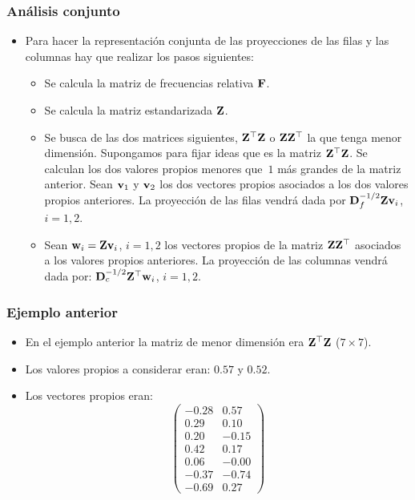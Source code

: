 \begin{frame}
\frametitle{Análisis conjunto}
\begin{itemize}
\item<2->{Para hacer la representación conjunta de las proyecciones de las filas y las columnas hay que realizar los pasos siguientes:\begin{itemize}
\item<3->{Se calcula la matriz de frecuencias relativa $\mathbf{F}$.}
\item<4->{Se calcula la matriz estandarizada $\mathbf{Z}$.}
\item<5->{Se busca de las dos matrices siguientes, $\mathbf{Z}^\top\mathbf{Z}$ o  $\mathbf{Z}\mathbf{Z}^\top$ la que tenga menor dimensión. Supongamos para fijar ideas que es la matriz $\mathbf{Z}^\top\mathbf{Z}$. Se calculan los dos valores propios menores que~$1$ más grandes de la matriz anterior. Sean $\mathbf{v}_1$ y $\mathbf{v}_2$ los dos vectores propios asociados a los dos valores propios anteriores. La proyección de las filas vendrá dada por $\mathbf{D}_f^{-1/2}\mathbf{Z}\mathbf{v}_i$, $i=1,2$.}
\item<6->{Sean $\mathbf{w}_i = \mathbf{Z}\mathbf{v}_i$, $i=1,2$ los vectores propios de la matriz $\mathbf{Z}\mathbf{Z}^\top$ asociados a los valores propios anteriores. La proyección de las columnas vendrá dada por: 
$\mathbf{D}_c^{-1/2}\mathbf{Z}^\top\mathbf{w}_i$, $i=1,2$.} 
\end{itemize}}
\end{itemize}
\end{frame}

\begin{frame}
\frametitle{Ejemplo anterior}
\begin{itemize}
\item<2->{En el ejemplo anterior la matriz de menor dimensión era $\mathbf{Z}^\top\mathbf{Z}$ ($7\times 7$).}
\item<3->{Los valores propios a considerar eran: $0.57$ y $0.52$.}
\item<4->{Los vectores propios eran:$$
\begin{pmatrix}
-0.28 & 0.57 \\
0.29 & 0.10 \\
0.20 & -0.15 \\
0.42 & 0.17 \\
0.06 & -0.00 \\
-0.37 & -0.74 \\
-0.69 & 0.27 
\end{pmatrix}
$$}
\end{itemize}
\end{frame}

